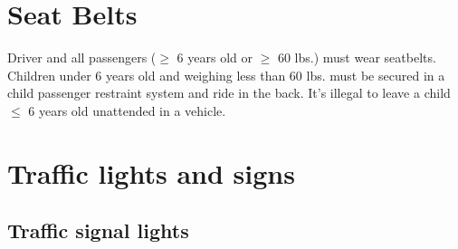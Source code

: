 \section{Seat Belts}

Driver and all passengers ($\geq$ 6 years old or $\geq$ 60 lbs.)
must wear seatbelts.
Children under 6 years old and weighing less than 60 lbs.
must be secured in a child passenger restraint system and ride in the back.
It's illegal to leave a child $\leq$ 6 years old unattended in a vehicle.


\section{Traffic lights and signs}

\subsection{Traffic signal lights}


